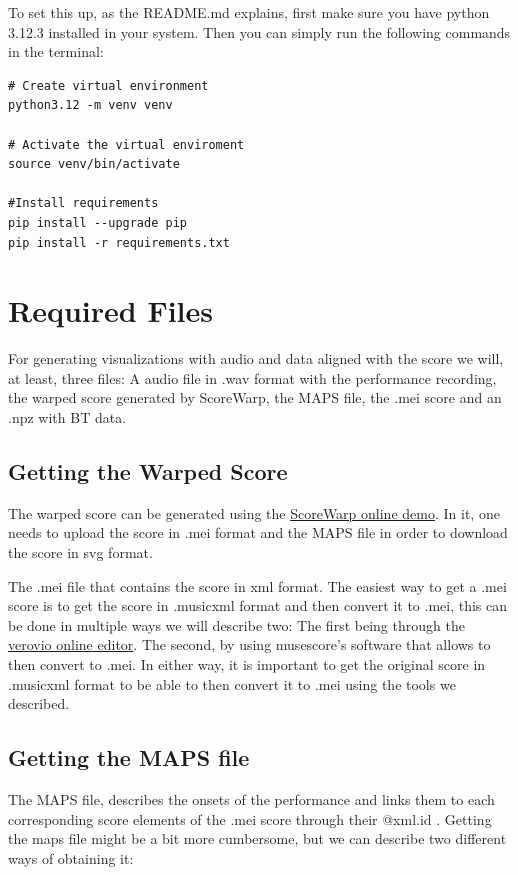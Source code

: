 To set this up, as the README.md explains, first make sure you have python 3.12.3 installed in your system. Then you can simply run the following commands in the terminal:

\begin{verbatim}
# Create virtual environment
python3.12 -m venv venv

# Activate the virtual enviroment
source venv/bin/activate

#Install requirements
pip install --upgrade pip
pip install -r requirements.txt

\end{verbatim}


\section{Required Files}
For generating visualizations with audio and data aligned with the score we will, at least, three files: A audio file in .wav format with the performance recording, the warped score generated by ScoreWarp, the MAPS file, the .mei score and an .npz with BT data.

\subsection{Getting the Warped Score}
The warped score can be generated using the \href{https://iwk-digital.github.io/scorewarp/}{ScoreWarp online demo}.  In it, one needs to upload the score in .mei format and the MAPS file in order to download the score in svg format. 

The .mei file that contains the score in xml format. The easiest way to get a .mei score is to get the score in .musicxml format and then convert it to .mei, this can be done in multiple ways we will describe two: The first being through the \href{https://editor.verovio.org/}{verovio online editor}. The second, by using musescore's software that allows to then convert to .mei. In either way, it is important to get the original score in .musicxml format to be able to then convert it to .mei using the tools we described. 

\subsection{Getting the MAPS file}
The MAPS file, describes the onsets of the performance and links them to each corresponding score elements of the .mei score through their @xml.id . Getting the maps file might be a bit more cumbersome, but we can describe two different ways of obtaining it: 

